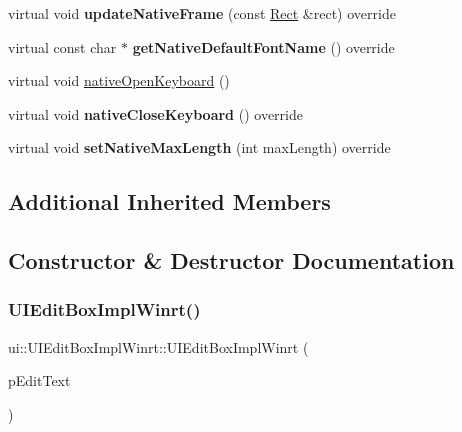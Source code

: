 \begin{DoxyCompactItemize}
virtual void {\bfseries update\+Native\+Frame} (const \hyperlink{classRect}{Rect} \&rect) override
\item 
\mbox{\label{classui_1_1UIEditBoxImplWinrt_a19322f08de4e665ab8a9a6b8b9d4e192}} 
virtual const char $\ast$ {\bfseries get\+Native\+Default\+Font\+Name} () override
\item 
virtual void \hyperlink{classui_1_1UIEditBoxImplWinrt_a68387234c978d3f8d466ad351bafb059}{native\+Open\+Keyboard} ()
\item 
\mbox{\label{classui_1_1UIEditBoxImplWinrt_ae148f2c1de85c20b2f0a74c29decea12}} 
virtual void {\bfseries native\+Close\+Keyboard} () override
\item 
\mbox{\label{classui_1_1UIEditBoxImplWinrt_a95a24eaf431472ff2aa2024799f50c0a}} 
virtual void {\bfseries set\+Native\+Max\+Length} (int max\+Length) override
\end{DoxyCompactItemize}
\subsection*{Additional Inherited Members}


\subsection{Constructor \& Destructor Documentation}
\mbox{\label{classui_1_1UIEditBoxImplWinrt_a30e610086632e20321d082978836cd90}} 
\subsubsection{\texorpdfstring{U\+I\+Edit\+Box\+Impl\+Winrt()}{UIEditBoxImplWinrt()}\hspace{0.1cm}{\footnotesize\ttfamily [1/2]}}
{\footnotesize\ttfamily ui\+::\+U\+I\+Edit\+Box\+Impl\+Winrt\+::\+U\+I\+Edit\+Box\+Impl\+Winrt (\begin{DoxyParamCaption}\item[{\hyperlink{classui_1_1EditBox}{Edit\+Box} $\ast$}]{p\+Edit\+Text }\end{DoxyParamCaption})}

